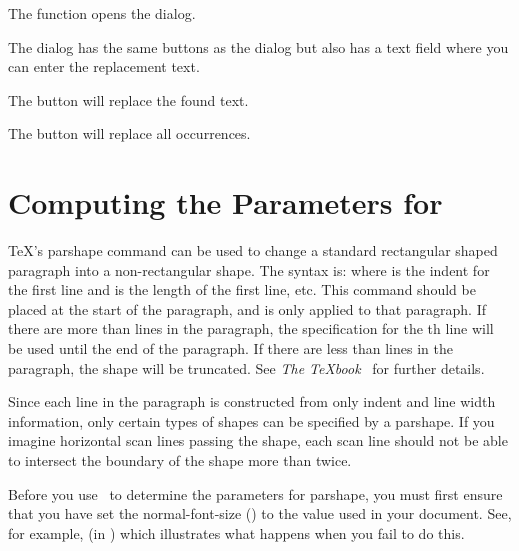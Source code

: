 %
The  function opens the
 dialog.

%
The  dialog has the same buttons as the
 dialog but also has a text field where you can enter
the replacement text.

%
The  button will replace the found text.

%
The  button will replace all occurrences.


\section{Computing the Parameters for }\label{sec:parshape}


\TeX's \gls{parshape} command can be used to change a
standard rectangular shaped paragraph into a non-rectangular
shape. The syntax is:
where  is the indent for
the first line and  is
the length of the first line, etc.  This command should be placed at
the start of the paragraph, and is only applied to that paragraph.
If there are more than  lines in the
paragraph, the specification for the th
line will be used until the end of the paragraph. If there are less
than  lines in the paragraph, the shape
will be truncated. See \emph{The \TeX{}book}~\cite{Knuth} for further
details.

Since each line in the paragraph is constructed from only indent and
line width information, only certain types of shapes can be
specified by a \gls{parshape}. If you imagine horizontal
scan lines passing  the shape, each scan line should not
be able to intersect the boundary of the shape more than twice.

Before you use \FlowframTk\ to determine the parameters for
\gls{parshape}, you must first ensure that you have set the
\gls{normal-font-size} () to the value
used in your document. See, for example,  (in
) which illustrates what happens when
you fail to do this.


